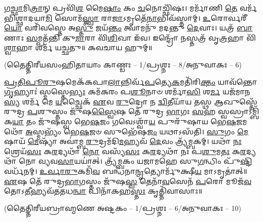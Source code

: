 𑌗\-\ul{𑌚𑍍𑌛𑌾}\-𑌮𑌿\-\ul{𑌤𑍍𑌰𑌾}\-𑌨𑍍 𑌪𑍍𑌰𑌵𑌿᳴\-\ul{𑌶} 𑌮𑍈\-\ul{𑌷𑌾𑌂} 𑌕𑌂 \ul{𑌚}\-𑌨𑍋𑌚𑍍𑌛𑌿᳴𑌷𑌃। 𑌮𑌰𑍍𑌮𑌾᳴𑌣𑌿 \ul{𑌤𑍇} 𑌵𑌰𑍍𑌮᳴𑌭𑌿𑌶𑍍𑌛𑌾𑌦𑌯𑌾\-\ul{𑌮𑌿} 𑌸𑍋𑌮᳴\-\ul{𑌸𑍍𑌤𑍍𑌵𑌾} 𑌰𑌾\-\ul{𑌜𑌾}\-𑌽𑌮𑍃𑌤𑍇᳴\-\ul{𑌨𑌾}\-𑌭𑌿𑌵᳴𑌸𑍍𑌤𑌾𑌮𑍍। \ul{𑌉}\-𑌰𑍋𑌰𑍍𑌵𑌰𑍀᳴\-\ul{𑌯𑍋} 𑌵𑌰𑌿᳴𑌵𑌸𑍍𑌤𑍇 𑌅\-\ul{𑌸𑍍𑌤𑍁} 𑌜𑌯᳴\-\ul{𑌨𑍍𑌤𑌂} 𑌤𑍍𑌵𑌾𑌮𑌨𑍁᳴ 𑌮𑌦𑌨𑍍𑌤𑍁 \ul{𑌦𑍇}\-𑌵𑌾𑌃। 𑌯𑌤𑍍𑌰᳴ \ul{𑌬𑌾}\-𑌣𑌾𑌃 \ul{𑌸}\-𑌮𑍍𑌪𑌤᳴𑌨𑍍𑌤𑌿 𑌕𑍁\-\ul{𑌮𑌾}\-𑌰𑌾 𑌵𑌿᳴\-\ul{𑌶𑌿}\-𑌖𑌾 𑌇᳴𑌵। 𑌇𑌨𑍍𑌦𑍍𑌰𑍋᳴ \ul{𑌨}\-𑌸𑍍𑌤𑌤𑍍𑌰᳴ 𑌵𑍃\-\ul{𑌤𑍍𑌰}\-𑌹𑌾 𑌵𑌿᳴\-\ul{𑌶𑍍𑌵𑌾}\-𑌹𑌾 𑌶𑌰𑍍𑌮᳴ 𑌯𑌚𑍍𑌛𑌤𑍁॥
𑌕𑌵𑌚𑌾𑌯 𑌹𑍁𑌮𑍍॥

{\small \closesection}

\centerline{\scriptsize (𑌤𑍈𑌤𑍍𑌤𑌿𑌰𑍀𑌯𑌸𑌂𑌹𑌿𑌤𑌾𑌯𑌾𑌂 𑌕𑌾𑌣𑍍𑌡𑌃 – 1/𑌪𑍍𑌰𑌶𑍍𑌨𑌃 – 8/𑌅𑌨𑍁𑌵𑌾𑌕𑌃 – 6)}

\-\ul{𑌪𑍍𑌰}\-\-\ul{𑌤𑌿}\-\-\ul{𑌪𑍂}\-\-\ul{𑌰𑍁}\-𑌷𑌮𑍇𑌕᳴𑌕𑌪𑌾\-\ul{𑌲𑌾}\-𑌨𑍍𑌨𑌿𑌰𑍍𑌵᳴\-\ul{𑌪}\-𑌤𑍍𑌯𑍇\-\ul{𑌕}\-𑌮𑌤𑌿᳴𑌰𑌿\-\ul{𑌕𑍍𑌤𑌂} 𑌯𑌾𑌵᳴𑌨𑍍𑌤𑍋 \ul{𑌗𑍃}\-𑌹𑍍𑌯𑌾𑌃॑ 𑌸𑍍𑌮𑌸𑍍𑌤𑍇\-\ul{𑌭𑍍𑌯𑌃} 𑌕𑌮᳴𑌕𑌰𑌂 𑌪\-\ul{𑌶𑍂}\-𑌨𑌾𑍞 𑌶𑌰𑍍𑌮𑌾᳴\-\ul{𑌸𑌿} 𑌶\-\ul{𑌰𑍍𑌮} 𑌯𑌜᳴𑌮𑌾𑌨\-\ul{𑌸𑍍𑌯} 𑌶𑌰𑍍𑌮᳴ 𑌮𑍇 \ul{𑌯}\-𑌚𑍍𑌛𑍈𑌕᳴ \ul{𑌏}\-𑌵 \ul{𑌰𑍁}\-𑌦𑍍𑌰𑍋 𑌨 \ul{𑌦𑍍𑌵𑌿}\-𑌤𑍀𑌯𑌾᳴𑌯 𑌤𑌸𑍍𑌥 \ul{𑌆}\-𑌖𑍁𑌸𑍍𑌤𑍇᳴ 𑌰𑍁𑌦𑍍𑌰 \ul{𑌪}\-𑌶𑍁𑌸𑍍𑌤𑌂 𑌜𑍁᳴𑌷\-\ul{𑌸𑍍𑌵𑍈}\-𑌷 𑌤𑍇᳴ 𑌰𑍁𑌦𑍍𑌰 \ul{𑌭𑌾}\-𑌗𑌃 \ul{𑌸}\-𑌹 𑌸𑍍𑌵𑌸𑍍𑌰𑌾𑌽𑌮𑍍𑌬𑌿᳴𑌕\-\ul{𑌯𑌾} 𑌤𑌂 𑌜𑍁᳴𑌷𑌸𑍍𑌵 𑌭𑍇\-\ul{𑌷}\-𑌜𑌂 𑌗𑌵𑍇𑌽𑌶𑍍𑌵𑌾᳴\-\ul{𑌯} 𑌪𑍁𑌰𑍁᳴𑌷𑌾𑌯 𑌭𑍇\-\ul{𑌷}\-𑌜𑌮𑌥𑍋᳴ \ul{𑌅}\-𑌸𑍍𑌮𑌭𑍍𑌯𑌂᳴ 𑌭𑍇\-\ul{𑌷}\-𑌜𑍞 𑌸𑍁𑌭𑍇᳴𑌷\-\ul{𑌜𑌂} 𑌯𑌥𑌾𑌽𑌸᳴𑌤𑌿। \ul{𑌸𑍁}\-𑌗𑌂 \ul{𑌮𑍇}\-𑌷𑌾𑌯᳴ \ul{𑌮𑍇}\-𑌷𑍍𑌯𑌾᳴ 𑌅𑌵𑌾॑𑌮𑍍𑌬 \ul{𑌰𑍁}\-𑌦𑍍𑌰𑌮᳴𑌦𑌿\-\ul{𑌮}\-𑌹𑍍𑌯𑌵᳴ \ul{𑌦𑍇}\-𑌵𑌂 𑌤𑍍𑌰𑍍𑌯᳴𑌮𑍍𑌬𑌕𑌮𑍍। 𑌯𑌥𑌾᳴ \ul{𑌨𑌃} 𑌶𑍍𑌰𑍇𑌯᳴\-\ul{𑌸𑌃} 𑌕\-\ul{𑌰}\-𑌦𑍍𑌯𑌥𑌾᳴ \ul{𑌨𑍋} 𑌵𑌸𑍍𑌯᳴\-\ul{𑌸𑌃} 𑌕\-\ul{𑌰}\-𑌦𑍍𑌯𑌥𑌾᳴ 𑌨𑌃 𑌪\-\ul{𑌶𑍁}\-𑌮\-\ul{𑌤𑌃} 𑌕\-\ul{𑌰}\-𑌦𑍍𑌯𑌥𑌾᳴ 𑌨𑍋 𑌵𑍍𑌯𑌵\-\ul{𑌸𑌾}\-𑌯𑌯𑌾॑𑌤𑍍। 𑌤𑍍𑌰𑍍𑌯᳴𑌮𑍍𑌬𑌕𑌂 𑌯𑌜𑌾𑌮𑌹𑍇 𑌸𑍁\-\ul{𑌗}\-𑌨𑍍𑌧𑌿𑌂 𑌪𑍁᳴\-\ul{𑌷𑍍𑌟𑌿}\-𑌵𑌰𑍍𑌧᳴𑌨𑌮𑍍। \ul{𑌉}\-\-\ul{𑌰𑍍𑌵𑌾}\-\-\ul{𑌰𑍁}\-𑌕𑌮𑌿᳴\-\ul{𑌵} 𑌬𑌨𑍍𑌧᳴𑌨𑌾\-\ul{𑌨𑍍𑌮𑍃}\-𑌤𑍍𑌯𑍋𑌰𑍍𑌮𑍁᳴𑌕𑍍𑌷𑍀\-\ul{𑌯} 𑌮𑌾𑌽𑌮𑍃𑌤𑌾॑𑌤𑍍॥ \ul{𑌏}\-𑌷 𑌤𑍇᳴ 𑌰𑍁𑌦𑍍𑌰\-\ul{𑌭𑌾}\-𑌗𑌸𑍍𑌤𑌂 𑌜𑍁᳴𑌷\-\ul{𑌸𑍍𑌵} 𑌤𑍇𑌨𑌾᳴\-\ul{𑌵}\-𑌸𑍇𑌨᳴ \ul{𑌪}\-𑌰𑍋 𑌮𑍂𑌜᳴\-\ul{𑌵}\-𑌤𑍋𑌽\-\ul{𑌤𑍀}\-𑌹𑍍𑌯𑌵᳴𑌤𑌤𑌧\-\ul{𑌨𑍍𑌵𑌾} 𑌪𑌿𑌨𑌾᳴𑌕𑌹\-\ul{𑌸𑍍𑌤𑌃} 𑌕𑍃𑌤𑍍𑌤𑌿᳴𑌵𑌾𑌸𑌾𑌃॥


\centerline{\scriptsize (𑌤𑍈𑌤𑍍𑌤𑌿𑌰𑍀𑌯𑌬𑍍𑌰𑌾𑌹𑍍𑌮𑌣𑍇 𑌅𑌷𑍍𑌟𑌕𑌂 – 1/𑌪𑍍𑌰𑌶𑍍𑌨𑌃 – 6/𑌅𑌨𑍁𑌵𑌾𑌕𑌃 – 10)}

